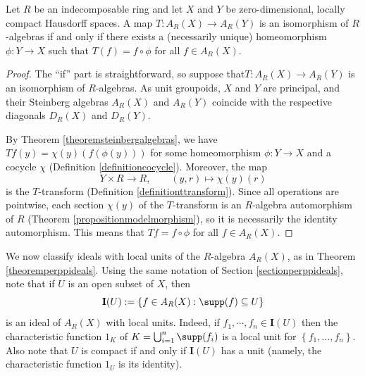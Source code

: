 \begin{proposition}\label{prop:isomorp}
Let $R$ be an indecomposable ring and let $X$ and $Y$ be zero-dimensional, locally compact Hausdorff spaces. A map $T:A_R(X) \rightarrow A_R(Y)$ is an isomorphism of $R$-algebras if and only if there exists a (necessarily unique) homeomorphism $\phi:Y\to X$ such that $T(f)=f\circ\phi$ for all $f\in A_R(X)$.
\end{proposition}

\begin{proof}
The ``if'' part is straightforward, so suppose that$T:A_R(X)\to A_R(Y)$ is an isomorphism of $R$-algebras. As unit groupoids, $X$ and $Y$ are principal, and their Steinberg algebras $A_R(X)$ and $A_R(Y)$ coincide with the respective diagonals $D_R(X)$ and $D_R(Y)$.

By Theorem \ref{theoremsteinbergalgebras}, we have $Tf(y)=\chi(y)(f(\phi(y)))$ for some homeomorphism $\phi:Y\to X$ and a cocycle $\chi$ (Definition \ref{definitioncocycle}). Moreover, the map
\[Y\times R\to R,\qquad (y,r)\mapsto\chi(y)(r)\]
is the $T$-transform (Definition \ref{definitionttransform}). Since all operations are pointwise, each section $\chi(y)$ of the $T$-transform is an $R$-algebra automorphism of $R$ (Theorem \ref{propositionmodelmorphism}), so it is necessarily the identity automorphism. This means that $Tf=f\circ\phi$ for all $f\in A_R(X)$.\qedhere
\end{proof}

We now classify ideals with local units of the $R$-algebra $A_R(X)$, as in Theorem \ref{theoremperppideals}. Using the same notation of Section \ref{sectionperppideals}, note that if $U$ is an open subset of $X$, then 
\[\mathbf{I}(U):=\left\{f\in A_R(X):\supp(f)\subseteq U\right\}\]%
is an ideal of $A_R(X)$ with local units. Indeed, if $f_1, \cdots, f_n \in \mathbf{I}(U)$ then  the characteristic function $1_K$ of $K=\bigcup_{i=1}^n \supp(f_i)$ is a local unit for $\left\{f_1,\ldots,f_n\right\}$. Also note that $U$ is compact if and only if $\mathbf{I}(U)$ has a unit (namely, the characteristic function $1_U$ is its identity).


